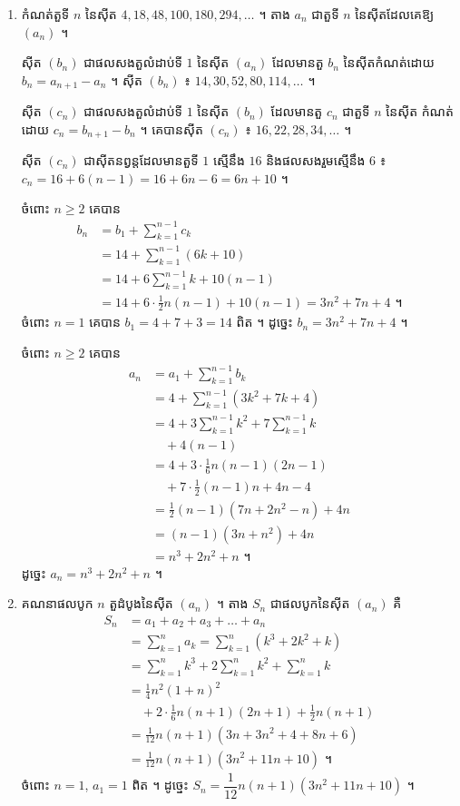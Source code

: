 \begin{enumerate}[a]
  \item កំណត់តួទី $n$ នៃស៊ីត $4, 18, 48, 100, 180, 294, \ldots$ ។ តាង $a_n$ ជាតួទី $n$ នៃស៊ីតដែលគេឱ្យ $(a_n)$ ។

  ស៊ីត $(b_n)$ ជាផលសងតួលំដាប់ទី $1$ នៃស៊ីត $(a_n)$ ដែលមានតួ $b_n$ នៃស៊ីតកំណត់ដោយ $b_n = a_{n+1} - a_n$ ។ ស៊ីត $(b_n)$ ៖ $14, 30, 52, 80, 114, \ldots$ ។

  ស៊ីត $(c_n)$ ជាផលសងតួលំដាប់ទី $1$ នៃស៊ីត $(b_n)$ ដែលមានតួ $c_n$ ជាតួទី $n$ នៃស៊ីត កំណត់ដោយ $c_n = b_{n+1} - b_n$ ។ គេបានស៊ីត $(c_n)$ ៖ $16, 22, 28, 34, \ldots$ ។

  ស៊ីត $(c_n)$ ជាស៊ីតនព្វន្តដែលមានតួទី $1$ ស្មើនឹង $16$ និងផលសងរួមស្មើនឹង $6$ ៖ $c_n = 16 + 6(n - 1) = 16 + 6n - 6 = 6n + 10$ ។

  ចំពោះ $n \ge 2$ គេបាន
  \[
  \begin{aligned}
b_n &= b_1 + \sum_{k=1}^{n-1} c_k\\
&= 14 + \sum_{k=1}^{n-1} (6k + 10)\\
&= 14 + 6\sum_{k=1}^{n-1} k + 10(n - 1)\\
&= 14 + 6 \cdot \frac{1}{2}n(n - 1) + 10(n - 1) = 3n^2 + 7n + 4 \text{ ។}
\end{aligned}
  \]
  ចំពោះ $n = 1$ គេបាន $b_1 = 4 + 7 + 3 = 14$ ពិត ។ ដូច្នេះ $b_n = 3n^2 + 7n + 4$ ។

  ចំពោះ $n \ge 2$ គេបាន
  \[
  \begin{aligned}
a_n &= a_1 + \sum_{k=1}^{n-1} b_k\\
&= 4 + \sum_{k=1}^{n-1} (3k^2 + 7k + 4)\\
&= 4 + 3\sum_{k=1}^{n-1} k^2 + 7\sum_{k=1}^{n-1} k\\
&\quad + 4(n - 1)\\
&= 4 + 3 \cdot \frac{1}{6}n(n - 1)(2n - 1)\\
&\quad + 7 \cdot \frac{1}{2}(n - 1)n + 4n - 4\\
&= \frac{1}{2}(n - 1)(7n + 2n^2 - n) + 4n\\
&= (n - 1)(3n + n^2) + 4n\\
&= n^3 + 2n^2 + n \text{ ។}
\end{aligned}
  \]
  ដូច្នេះ $a_n = n^3 + 2n^2 + n$ ។
  \item គណនាផលបូក $n$ តួដំបូងនៃស៊ីត $(a_n)$ ។ តាង $S_n$ ជាផលបូកនៃស៊ីត $(a_n)$ គឺ
  \[
  \begin{aligned}
S_n &= a_1 + a_2 + a_3 + \ldots + a_n\\
&= \sum_{k=1}^{n} a_k = \sum_{k=1}^{n} (k^3 + 2k^2 + k)\\
&= \sum_{k=1}^{n} k^3 + 2\sum_{k=1}^{n} k^2 + \sum_{k=1}^{n} k\\
&= \frac{1}{4}n^2(1 + n)^2\\
&\quad + 2 \cdot \frac{1}{6}n(n + 1)(2n + 1) + \frac{1}{2}n(n + 1)\\
&= \frac{1}{12}n(n + 1)(3n + 3n^2 + 4 + 8n + 6)\\
&= \frac{1}{12}n(n + 1)(3n^2 + 11n + 10) \text{ ។}
\end{aligned}
  \]
  ចំពោះ $n = 1$, $a_1 = 1$ ពិត ។ ដូច្នេះ $S_n = \dfrac{1}{12}n(n + 1)(3n^2 + 11n + 10)$ ។
\end{enumerate}

